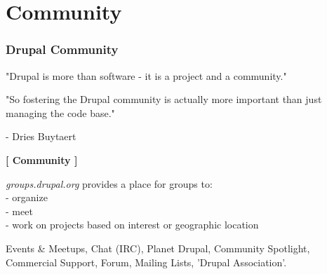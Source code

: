 \section{Community}

\begin{frame}[allowframebreaks]
\frametitle{Drupal Community}

"Drupal is more than software - it is a project and a community." \linebreak

"So fostering the Drupal community is actually more important than just managing the code base."

 \hfill - Dries Buytaert

\textbf{[ Community ]}

\emph{groups.drupal.org} provides a place for groups to: \\
- organize \\
- meet \\
- work on projects based on interest or geographic location \linebreak

	
Events \& Meetups, Chat (IRC), Planet Drupal, Community Spotlight, Commercial Support, Forum, Mailing Lists, 'Drupal Association'.

\end{frame}

